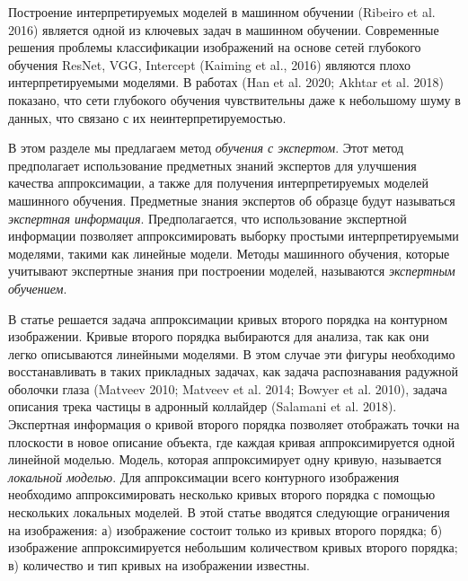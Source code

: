Построение интерпретируемых моделей в машинном обучении (Ribeiro et al. 2016) является одной из ключевых задач в машинном обучении.
Современные решения проблемы классификации изображений на основе сетей глубокого обучения ResNet, VGG, Intercept (Kaiming et al., 2016) являются плохо интерпретируемыми моделями.
В работах (Han et al. 2020; Akhtar et al. 2018)  показано, что сети глубокого обучения чувствительны даже к небольшому шуму в данных, что связано с их неинтерпретируемостью.

В этом разделе мы предлагаем метод \textit{обучения с экспертом}.
Этот метод предполагает использование предметных знаний экспертов для улучшения качества аппроксимации, а также для получения интерпретируемых моделей машинного обучения.
Предметные знания экспертов об образце будут называться \textit{экспертная информация}.
Предполагается, что использование экспертной информации позволяет аппроксимировать выборку простыми интерпретируемыми моделями, такими как линейные модели. Методы машинного обучения, которые учитывают экспертные знания при построении моделей, называются \textit{экспертным обучением}.


В статье решается задача аппроксимации кривых второго порядка на контурном изображении. Кривые второго порядка выбираются для анализа, так как они легко описываются линейными моделями. В этом случае эти фигуры необходимо восстанавливать в таких прикладных задачах, как задача распознавания радужной оболочки глаза (Matveev 2010; Matveev et al. 2014; Bowyer et al. 2010), задача описания трека частицы в адронный коллайдер (Salamani et al. 2018). Экспертная информация о кривой второго порядка позволяет отображать точки на плоскости в новое описание объекта, где каждая кривая аппроксимируется одной линейной моделью. Модель, которая аппроксимирует одну кривую, называется \textit{локальной моделью}. Для аппроксимации всего контурного изображения необходимо аппроксимировать несколько кривых второго порядка с помощью нескольких локальных моделей. В этой статье вводятся следующие ограничения на изображения: а) изображение состоит только из кривых второго порядка; б) изображение аппроксимируется небольшим количеством кривых второго порядка; в) количество и тип кривых на изображении известны.

